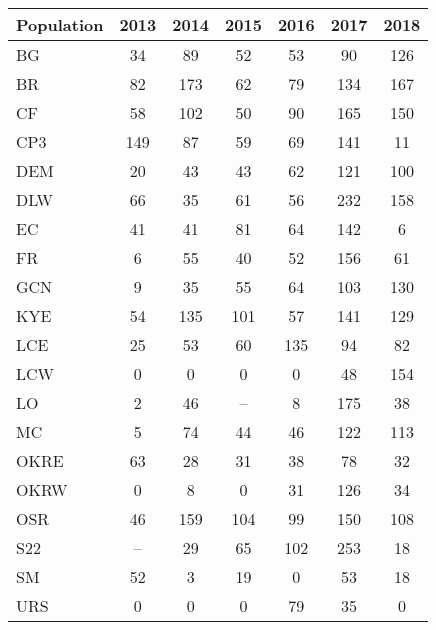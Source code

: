 \documentclass[varwidth=\maxdimen,border=1pt]{standalone}
\begin{document}
 
\begin{tabular}{lcccccc}
  \hline
Population & 2013 & 2014 & 2015 & 2016 & 2017 & 2018 \\ 
  \hline
BG &  34 &  89 &  52 &  53 &  90 & 126 \\ 
  BR &  82 & 173 &  62 &  79 & 134 & 167 \\ 
  CF &  58 & 102 &  50 &  90 & 165 & 150 \\ 
  CP3 & 149 &  87 &  59 &  69 & 141 &  11 \\ 
  DEM &  20 &  43 &  43 &  62 & 121 & 100 \\ 
  DLW &  66 &  35 &  61 &  56 & 232 & 158 \\ 
  EC &  41 &  41 &  81 &  64 & 142 &   6 \\ 
  FR &   6 &  55 &  40 &  52 & 156 &  61 \\ 
  GCN &   9 &  35 &  55 &  64 & 103 & 130 \\ 
  KYE &  54 & 135 & 101 &  57 & 141 & 129 \\ 
  LCE &  25 &  53 &  60 & 135 &  94 &  82 \\ 
  LCW &   0 &   0 &   0 &   0 &  48 & 154 \\ 
  LO &   2 &  46 & -- &   8 & 175 &  38 \\ 
  MC &   5 &  74 &  44 &  46 & 122 & 113 \\ 
  OKRE &  63 &  28 &  31 &  38 &  78 &  32 \\ 
  OKRW &   0 &   8 &   0 &  31 & 126 &  34 \\ 
  OSR &  46 & 159 & 104 &  99 & 150 & 108 \\ 
  S22 & -- &  29 &  65 & 102 & 253 &  18 \\ 
  SM &  52 &   3 &  19 &   0 &  53 &  18 \\ 
  URS &   0 &   0 &   0 &  79 &  35 &   0 \\ 
     \hline
\end{tabular}
 
\end{document}
